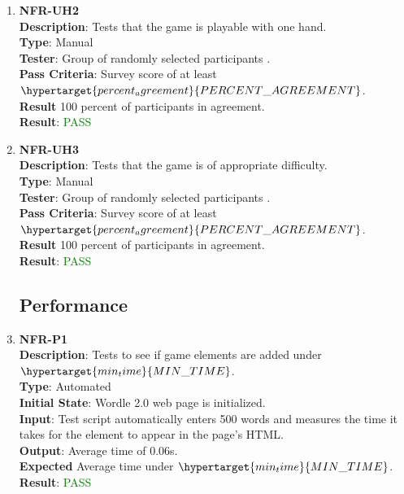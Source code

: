 \documentclass[12pt, titlepage]{article}
\begin{document}
\begin{enumerate}
\item \textbf{NFR-UH2\\}
\textbf{Description}: Tests that the game is playable with one hand.\\
\textbf{Type}: Manual\\
\textbf{Tester}: Group of randomly selected participants .\\
\textbf{Pass Criteria}: Survey score of at least $\hypertarget{percent_agreement}{PERCENT\_AGREEMENT}$.\\
\textbf{Result} 100 percent of participants in agreement.\\
\textbf{Result}: \textcolor{green}{PASS}\\

\item \textbf{NFR-UH3\\}
\textbf{Description}: Tests that the game is of appropriate difficulty.\\
\textbf{Type}: Manual\\
\textbf{Tester}: Group of randomly selected participants .\\
\textbf{Pass Criteria}: Survey score of at least $\hypertarget{percent_agreement}{PERCENT\_AGREEMENT}$.\\
\textbf{Result} 100 percent of participants in agreement.\\
\textbf{Result}: \textcolor{green}{PASS}\\


		
\subsection{Performance}

\item \textbf{NFR-P1\\}
\textbf{Description}: Tests to see if game elements are added under $\hypertarget{min_time}{MIN\_TIME}$.\\
\textbf{Type}: Automated\\
\textbf{Initial State}: Wordle 2.0 web page is initialized.\\
\textbf{Input}: Test script automatically enters 500 words and measures the time it takes for the element to appear in the page's HTML.\\
\textbf{Output}: Average time of 0.06s.\\
\textbf{Expected} Average time under $\hypertarget{min_time}{MIN\_TIME}$.\\
\textbf{Result}: \textcolor{green}{PASS}\\


\end{enumerate}
\end{document}
